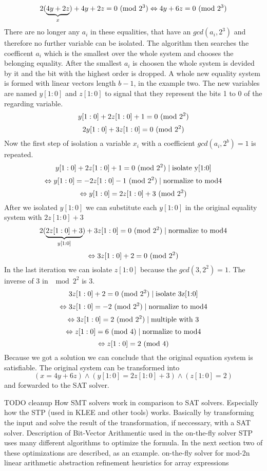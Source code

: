 $$2(\underbrace{4y+2z}_{x})+ 4y + 2z = 0 \ (\mathrm{mod}\ 2^3) \Leftrightarrow 4y + 6z = 0\ (\mathrm{mod}\ 2^3) $$
There are no longer any ${a_i}$ in these equalities, that have an $gcd(a_i,2^3)$ and therefore no further variable can be isolated.
The algorithm then searches the coefficent $a_i$ which is the smallest over the whole system and chooses the belonging equality.
After the smallest $a_i$ is choosen the whole system is devided by it and the bit with the highest order is dropped.
A whole new equality system is formed with linear vectors length $b-1$, in the example two.
The new variables are named $y[1:0]$ and $z[1:0]$ to signal that they represent the bits 1 to 0 of the regarding variable.
$$y[1 : 0] + 2z[1 : 0] + 1 = 0 \ (\mathrm{mod}\ 2^2)$$
$$2y[1 : 0] + 3z[1 : 0] = 0\ (\mathrm{mod}\ 2^2)$$
Now the first step of isolation a variable $x_i$ with a coefficient $gcd(a_i, 2^b)=1$ is repeated.
$$y[1 : 0] + 2z[1 : 0] + 1 = 0 \ (\mathrm{mod}\ 2^2)\mid \text{isolate y[1:0]}$$
$$\Leftrightarrow y[1 : 0] = -2z[1 : 0] -1 \ (\mathrm{mod}\ 2^2) \mid \text{normalize to mod4}$$
$$\Leftrightarrow y[1 : 0] = 2z[1 : 0] +3 \ (\mathrm{mod}\ 2^2)$$
After we isolated $y[1 : 0] $ we can substitute each $y[1 : 0] $ in the original equality system with $2z[1:0]+3$
$$2(\underbrace{2z[1:0]+3}_{y[1:0]}) + 3z[1 : 0] = 0\ (\mathrm{mod}\ 2^2) \mid \text{normalize to mod4}$$
$$\Leftrightarrow 3z[1:0] + 2 = 0 \ (\mathrm{mod}\ 2^2)$$
In the last iteration we can isolate $z[1:0]$ because the $gcd(3,2^2) = 1$. The inverse of 3 in $\mod{2^2}$ is 3.
$$3z[1:0] + 2 = 0 \ (\mathrm{mod}\ 2^2) \mid \text{isolate 3z[1:0]}$$
$$\Leftrightarrow 3z[1:0]=-2  \ (\mathrm{mod}\ 2^2)   \mid \text{normalize to mod4}$$
$$\Leftrightarrow 3z[1:0]=2  \ (\mathrm{mod}\ 2^2)   \mid \text{multiple with 3}$$
$$\Leftrightarrow z[1:0]=6  \ (\mathrm{mod}\ 4)  \mid \text{normalize to mod4}$$
$$\Leftrightarrow z[1:0]=2  \ (\mathrm{mod}\ 4)$$
Because we got a solution we can conclude that the original equation system is satisfiable.
The original system can be transformed into $$(x = 4y + 6z) \land (y[1 : 0] = 2z[1 : 0] + 3) \land (z[1 : 0] = 2)$$ and forwarded to the SAT solver.

TODO cleanup
How SMT solvers work in comparison to SAT solvers.
Especially how the STP \cite{Ganesh:2007:DPB:1770351.1770421} (used in KLEE and other tools) works.
Basically by transforming the input and solve the result of the transformation, if neccessary, with a SAT solver.
Description of Bit-Vector Arithmentic used in the on-the-fly solver\cite{10.1007/978-3-540-71209-1_28}
STP uses many different algorithms to optimize the formula. In the next section two of these optimizations are described, as an example.
on-the-fly solver for mod-2n linear arithmetic
abstraction refinement heuristics for array expressions 